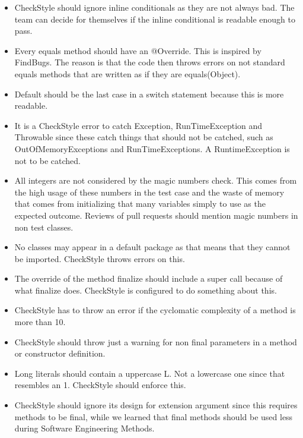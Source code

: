 \documentclass[11pt,a4paper]{report}
\begin{document}
\begin{itemize}

\item CheckStyle should ignore inline conditionals as they are not always bad. The team can decide for themselves if the inline conditional is readable enough to pass.

\item Every equals method should have an @Override. This is inspired by FindBugs. The reason is that the code then throws errors on not standard equals methods that are written as if they are equals(Object).

\item Default should be the last case in a switch statement because this is more readable.

\item It is a CheckStyle error to catch Exception, RunTimeException and Throwable since these catch things that should not be catched, such as OutOfMemoryExceptions and RunTimeExceptions. A RuntimeException is not to be catched.

\item All integers are not considered by the magic numbers check. This comes from the high usage of these numbers in the test case and the waste of memory that comes from initializing that many variables simply to use as the expected outcome. Reviews of pull requests should mention magic numbers in non test classes.

\item No classes may appear in a default package as that means that they cannot be imported. CheckStyle throws errors on this.

\item The override of the method finalize should include a super call because of what finalize does. CheckStyle is configured to do something about this.

\item CheckStyle has to throw an error if the cyclomatic complexity of a method is more than 10.

\item CheckStyle should throw just a warning for non final parameters in a method or constructor definition.

\item Long literals should contain a uppercase L. Not a lowercase one since that resembles an 1. CheckStyle should enforce this.

\item CheckStyle should ignore its design for extension argument since this requires methods to be final, while we learned that final methods should be used less during Software Engineering Methods.

\end{itemize}
\end{document}
